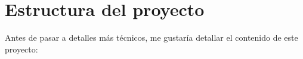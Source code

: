 




\section{Estructura del proyecto}

\bigskip
Antes de pasar a detalles más técnicos, me gustaría detallar el contenido de este proyecto:

